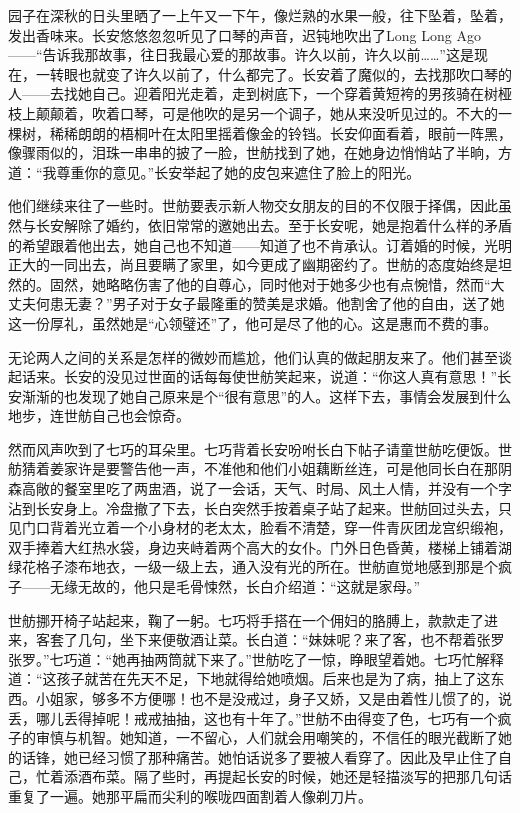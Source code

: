 \par 园子在深秋的日头里晒了一上午又一下午，像烂熟的水果一般，往下坠着，坠着，发出香味来。长安悠悠忽忽听见了口琴的声音，迟钝地吹出了Long Long Ago ——“告诉我那故事，往日我最心爱的那故事。许久以前，许久以前……”这是现在，一转眼也就变了许久以前了，什么都完了。长安着了魔似的，去找那吹口琴的人——去找她自己。迎着阳光走着，走到树底下，一个穿着黄短袴的男孩骑在树桠枝上颠颠着，吹着口琴，可是他吹的是另一个调子，她从来没听见过的。不大的一棵树，稀稀朗朗的梧桐叶在太阳里摇着像金的铃铛。长安仰面看着，眼前一阵黑，像骤雨似的，泪珠一串串的披了一脸，世舫找到了她，在她身边悄悄站了半晌，方道：“我尊重你的意见。”长安举起了她的皮包来遮住了脸上的阳光。
\par 他们继续来往了一些时。世舫要表示新人物交女朋友的目的不仅限于择偶，因此虽然与长安解除了婚约，依旧常常的邀她出去。至于长安呢，她是抱着什么样的矛盾的希望跟着他出去，她自己也不知道——知道了也不肯承认。订着婚的时候，光明正大的一同出去，尚且要瞒了家里，如今更成了幽期密约了。世舫的态度始终是坦然的。固然，她略略伤害了他的自尊心，同时他对于她多少也有点惋惜，然而“大丈夫何患无妻？”男子对于女子最隆重的赞美是求婚。他割舍了他的自由，送了她这一份厚礼，虽然她是“心领璧还”了，他可是尽了他的心。这是惠而不费的事。
\par 无论两人之间的关系是怎样的微妙而尴尬，他们认真的做起朋友来了。他们甚至谈起话来。长安的没见过世面的话每每使世舫笑起来，说道：“你这人真有意思！”长安渐渐的也发现了她自己原来是个“很有意思”的人。这样下去，事情会发展到什么地步，连世舫自己也会惊奇。
\par 然而风声吹到了七巧的耳朵里。七巧背着长安吩咐长白下帖子请童世舫吃便饭。世舫猜着姜家许是要警告他一声，不准他和他们小姐藕断丝连，可是他同长白在那阴森高敞的餐室里吃了两盅酒，说了一会话，天气、时局、风土人情，并没有一个字沾到长安身上。冷盘撤了下去，长白突然手按着桌子站了起来。世舫回过头去，只见门口背着光立着一个小身材的老太太，脸看不清楚，穿一件青灰团龙宫织缎袍，双手捧着大红热水袋，身边夹峙着两个高大的女仆。门外日色昏黄，楼梯上铺着湖绿花格子漆布地衣，一级一级上去，通入没有光的所在。世舫直觉地感到那是个疯子——无缘无故的，他只是毛骨悚然，长白介绍道：“这就是家母。”
\par 世舫挪开椅子站起来，鞠了一躬。七巧将手搭在一个佣妇的胳膊上，款款走了进来，客套了几句，坐下来便敬酒让菜。长白道：“妹妹呢？来了客，也不帮着张罗张罗。”七巧道：“她再抽两筒就下来了。”世舫吃了一惊，睁眼望着她。七巧忙解释道：“这孩子就苦在先天不足，下地就得给她喷烟。后来也是为了病，抽上了这东西。小姐家，够多不方便哪！也不是没戒过，身子又娇，又是由着性儿惯了的，说丢，哪儿丢得掉呢！戒戒抽抽，这也有十年了。”世舫不由得变了色，七巧有一个疯子的审慎与机智。她知道，一不留心，人们就会用嘲笑的，不信任的眼光截断了她的话锋，她已经习惯了那种痛苦。她怕话说多了要被人看穿了。因此及早止住了自己，忙着添酒布菜。隔了些时，再提起长安的时候，她还是轻描淡写的把那几句话重复了一遍。她那平扁而尖利的喉咙四面割着人像剃刀片。
